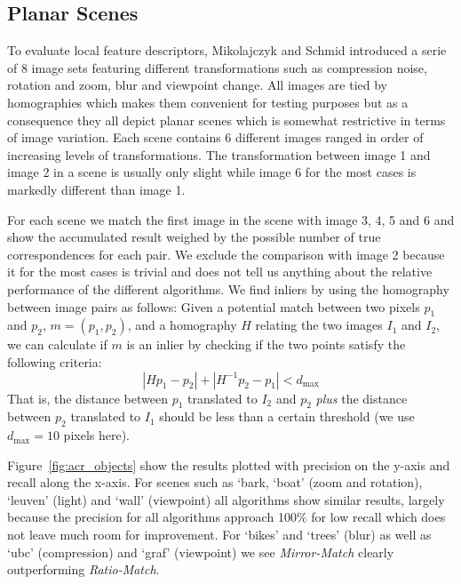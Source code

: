 \documentclass[journal]{IEEEtran}
\begin{document}
\subsection{Planar Scenes}

To evaluate local feature descriptors, Mikolajczyk and Schmid introduced
a serie of $8$ image sets featuring different transformations such as 
compression noise, rotation and zoom, blur and viewpoint change. All 
images are tied by homographies which makes them convenient for testing 
purposes but as a consequence they all depict planar scenes which is 
somewhat restrictive in terms of image variation. Each scene contains 6 
different images ranged in order of increasing levels of 
transformations. The transformation between image 1 and image 2 in a 
scene is usually only slight while image 6 for the most cases is 
markedly different than image 1.

For each scene we match the first image in the scene with image 3, 4, 5 
and 6 and show the accumulated result weighed by the possible number of 
true correspondences for each pair. We exclude the comparison with image 
2 because it for the most cases is trivial and does not tell us anything 
about the relative performance of the different algorithms. We find 
inliers by using the homography between image pairs as follows: Given a 
potential match between two pixels $p_1$ and $p_2$, $m = \left(p_1, 
p_2\right)$, and a homography $H$ relating the two images $I_1$ and 
$I_2$, we can calculate if $m$ is an inlier by checking if the two 
points satisfy the following criteria:
\begin{equation*}
\left\vert H p_1 - p_2 \right\vert + \left\vert H^{-1}p_2 - p_1 \right\vert < d_{\max}
\end{equation*}
That is, the distance between $p_1$ translated to $I_2$ and $p_2$ 
\emph{plus} the distance between $p_2$ translated to $I_1$ should be 
less than a certain threshold (we use $d_{\max}=10$ pixels here).

Figure~\ref{fig:acr_objects} show the results plotted with precision on 
the y-axis and recall along the x-axis. For scenes such as `bark, `boat' 
(zoom and rotation), `leuven' (light) and `wall' (viewpoint) all 
algorithms show similar results, largely because the precision for all 
algorithms approach 100\% for low recall which does not leave much room 
for improvement. For `bikes' and `trees' (blur) as well as `ubc'
(compression) and `graf' (viewpoint) we see \emph{Mirror-Match} clearly 
outperforming \emph{Ratio-Match}.
\end{document}
